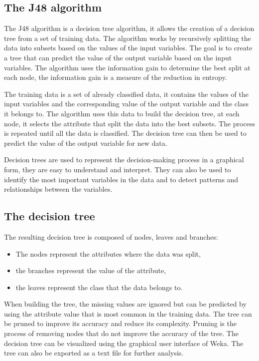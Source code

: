 \subsection{The J48 algorithm}
\label{subsec:j48}

The J48 algorithm is a decision tree algorithm, it allows the creation of a decision tree from a set of training data. The
algorithm works by recursively splitting the data into subsets based on the values of the input variables. The goal is to
create a tree that can predict the value of the output variable based on the input variables. The algorithm uses the
information gain to determine the best split at each node, the information gain is a measure of the reduction in entropy.

The training data is a set of already classified data, it contains the values of the input variables and the corresponding
value of the output variable and the class it belongs to. The algorithm uses this data to build the decision tree, at each
node, it selects the attribute that split the data into the best subsets. The process is repeated until all the data is
classified. The decision tree can then be used to predict the value of the output variable for new data.

Decision trees are used to represent the decision-making process in a graphical form, they are easy to understand and
interpret. They can also be used to identify the most important variables in the data and to detect patterns and
relationships between the variables.

\subsection{The decision tree}
\label{subsubsec:decision-tree}

The resulting decision tree is composed of nodes, leaves and branches:
\begin{itemize}
	\item The nodes represent the attributes where the data was split,
	\item the branches represent the value of the attribute,
	\item the leaves represent the class that the data belongs to.
\end{itemize}

When building the tree, the missing values are ignored but can be predicted by using the attribute value that is most
common in the training data. The tree can be pruned to improve its accuracy and reduce its complexity. Pruning is the
process of removing nodes that do not improve the accuracy of the tree. The decision tree can be visualized using the
graphical user interface of Weka. The tree can also be exported as a text file for further analysis.

